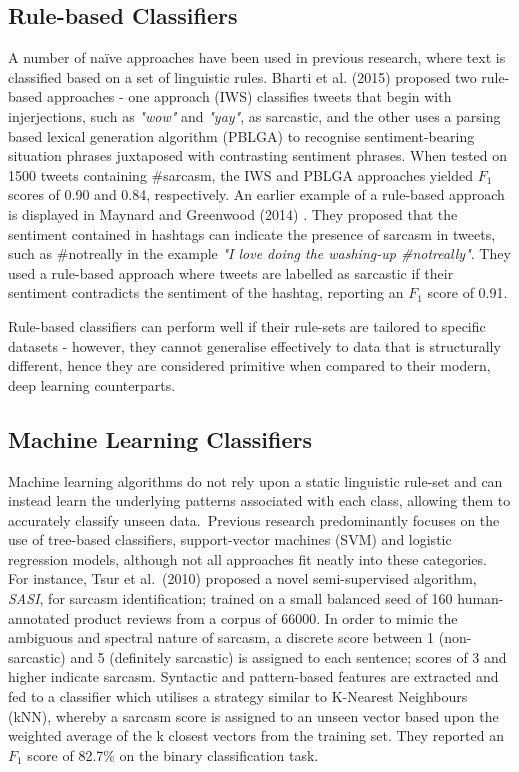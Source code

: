 \documentclass[12pt,a4paper]{article}
\begin{document}
\subsection{Rule-based Classifiers}\vspace{-10pt}
\noindent A number of na\"{i}ve approaches have been used in previous research, where text is classified based on a set of linguistic rules. Bharti et al. (2015) \cite{bharti2015parsing} proposed two rule-based approaches - one approach (IWS) classifies tweets that begin with injerjections, such as \textit{"wow"} and \textit{"yay"}, as sarcastic, and the other uses a parsing based lexical generation algorithm (PBLGA) to recognise sentiment-bearing situation phrases juxtaposed with contrasting sentiment phrases. When tested on 1500 tweets containing \#sarcasm, the IWS and PBLGA approaches yielded $F_1$ scores of 0.90 and 0.84, respectively. An earlier example of a rule-based approach is displayed in Maynard and Greenwood (2014) \cite{maynard2014cares}. They proposed that the sentiment contained in hashtags can indicate the presence of sarcasm in tweets, such as \#notreally in the example \textit{"I love doing the washing-up \#notreally"}. They used a rule-based approach where tweets are labelled as sarcastic if their sentiment contradicts the sentiment of the hashtag, reporting an $F_{1}$ score of 0.91. 

Rule-based classifiers can perform well if their rule-sets are tailored to specific datasets - however, they cannot generalise effectively to data that is structurally different, hence they are considered  primitive when compared to their modern, deep learning counterparts.

\subsection{Machine Learning Classifiers}\vspace{-10pt}
\noindent Machine learning algorithms do not rely upon a static linguistic rule-set and can instead learn the underlying patterns associated with each class, allowing them to accurately classify unseen data.\ Previous research predominantly focuses on the use of tree-based classifiers, support-vector machines (SVM) and logistic regression models, although not all approaches fit neatly into these categories. For instance, Tsur et al.\ (2010) \cite{tsur2010icwsm} proposed a novel semi-supervised algorithm, \textit{SASI}, for sarcasm identification; trained on a small balanced seed of 160 human-annotated product reviews from a corpus of 66000. In order to mimic the ambiguous and spectral nature of sarcasm, a discrete score between 1 (non-sarcastic) and 5 (definitely sarcastic) is assigned to each sentence; scores of 3 and higher indicate sarcasm. Syntactic and pattern-based features are extracted and fed to a classifier which utilises a strategy similar to K-Nearest Neighbours (kNN), whereby a sarcasm score is assigned to an unseen vector based upon the weighted average of the k closest vectors from the training set. They reported an $F_{1}$ score of 82.7\% on the binary classification task.
\end{document}
